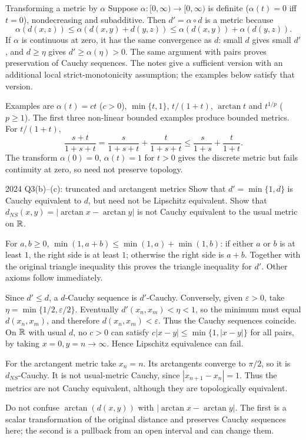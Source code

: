 \begin{note}{Transforming a metric by $\alpha$}
Suppose $\alpha:[0,\infty)\to[0,\infty)$ is definite ($\alpha(t)=0$ iff $t=0$), nondecreasing and subadditive. Then $d'=\alpha\circ d$ is a metric because
\[\alpha(d(x,z))\le\alpha(d(x,y)+d(y,z))\le\alpha(d(x,y))+\alpha(d(y,z)).\]
If $\alpha$ is continuous at zero, it has the same convergence as $d$: small $d$ gives small $d'$, and $d\ge\eta$ gives $d'\ge\alpha(\eta)>0$. The same argument with pairs proves preservation of Cauchy sequences. The notes give a sufficient version with an additional local strict-monotonicity assumption; the examples below satisfy that version.

Examples are $\alpha(t)=ct$ ($c>0$), $\min\{t,1\}$, $t/(1+t)$, $\arctan t$ and $t^{1/p}$ ($p\ge1$). The first three non-linear bounded examples produce bounded metrics. For $t/(1+t)$,
\[\frac{s+t}{1+s+t}=\frac{s}{1+s+t}+\frac{t}{1+s+t}\le\frac{s}{1+s}+\frac{t}{1+t}.\]
The transform $\alpha(0)=0$, $\alpha(t)=1$ for $t>0$ gives the discrete metric but fails continuity at zero, so need not preserve topology.
\end{note}
\begin{exam}{2024 Q3(b)--(c): truncated and arctangent metrics}
Show that $d'=\min\{1,d\}$ is Cauchy equivalent to $d$, but need not be Lipschitz equivalent. Show that $d_{NS}(x,y)=|\arctan x-\arctan y|$ is not Cauchy equivalent to the usual metric on $\mathbb R$.
\end{exam}
\begin{answer}
For $a,b\ge0$, $\min(1,a+b)\le\min(1,a)+\min(1,b)$: if either $a$ or $b$ is at least $1$, the right side is at least $1$; otherwise the right side is $a+b$. Together with the original triangle inequality this proves the triangle inequality for $d'$. Other axioms follow immediately.

Since $d'\le d$, a $d$-Cauchy sequence is $d'$-Cauchy. Conversely, given $\varepsilon>0$, take $\eta=\min\{1/2,\varepsilon/2\}$. Eventually $d'(x_n,x_m)<\eta<1$, so the minimum must equal $d(x_n,x_m)$, and therefore $d(x_n,x_m)<\varepsilon$. Thus the Cauchy sequences coincide. On $\mathbb R$ with usual $d$, no $c>0$ can satisfy $c|x-y|\le\min\{1,|x-y|\}$ for all pairs, by taking $x=0,y=n\to\infty$. Hence Lipschitz equivalence can fail.

For the arctangent metric take $x_n=n$. Its arctangents converge to $\pi/2$, so it is $d_{NS}$-Cauchy. It is not usual-metric Cauchy, since $|x_{n+1}-x_n|=1$. Thus the metrics are not Cauchy equivalent, although they are topologically equivalent.
\end{answer}
\begin{tip}
Do not confuse $\arctan(d(x,y))$ with $|\arctan x-\arctan y|$. The first is a scalar transformation of the original distance and preserves Cauchy sequences here; the second is a pullback from an open interval and can change them.
\end{tip}


